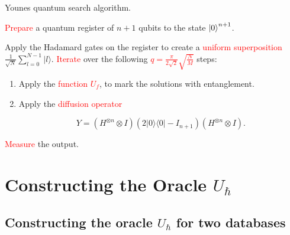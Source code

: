 \documentclass{beamer}
\begin{document}
\begin{frame}

\begin{algorithm}[H]
\caption{Younes quantum search algorithm.\label{1st-algo}}
\begin{algorithmic}[1]

\State \textcolor{red}{Prepare} a quantum register of $n+1$ qubits to the state ${\left\vert{0}\right\rangle}^{n+1}$.
\item Apply the Hadamard gates on the register to create a \textcolor{red}{uniform superposition} $\frac{1}{\sqrt{N}}\sum_{l=0}^{N-1}{\vert l\rangle}$.
\State  \textcolor{red}{Iterate} over the following \textcolor{red}{$q=\frac{\pi}{2\sqrt{2}}\sqrt{\frac{N}{M}}$} steps:
\begin{enumerate}[1.]
\item Apply the \textcolor{red}{function $U_f$}, to mark the solutions with entanglement.
\item Apply the \textcolor{red}{ diffusion operator} 

\begin{equation*}
Y=(H^{\otimes n}\otimes I )(2\vert 0\rangle\langle 0\vert -I_{n+1})(H^{\otimes n}\otimes I).
\end{equation*}


\end{enumerate}

\State \textcolor{red}{Measure} the output.

\end{algorithmic}
\end{algorithm}

\end{frame}


\section{Constructing the Oracle $U_\hbar$}

\subsection*{Constructing the oracle $U_\hbar$ for two databases}
\end{document}
